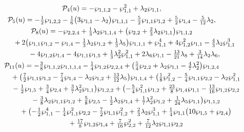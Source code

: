 \documentclass[pdftex]{sigma}
\numberwithin{equation}{section}
\begin{document}
\begin{gather*}
\mathcal{P}_4(u) = - \wp _{1,1,2} - \wp_{1,1}^2 + \lambda_2 \wp_{1,1}, \\
\mathcal{P}_5(u) = - \tfrac{1}{2} \wp _{1,2,2} - \tfrac{1}{6} \big(3 \wp_{1,1} - \lambda_2\big)\wp_{1,1,1} - \tfrac{5}{2}\wp_{1,1} \wp_{1,2} + \tfrac{5}{2} \wp_{1,4} -\tfrac{5}{12} \lambda_2, \\
\mathcal{P}_8(u) = -\wp_{2,2,4} + \tfrac{1}{3} \lambda_2 \wp_{1,1,4} +\big(\wp_{2,2} + \tfrac{2}{3} \lambda_2 \wp_{1,1}\big)\wp _{1,1,2}\\
\hphantom{\mathcal{P}_8(u) =}{} + 2\big(\wp_{1,1}\wp_{1,2} - \wp_{1,4} - \tfrac{1}{3} \lambda_2 \wp_{1,2} + \tfrac{1}{3} \lambda_5\big) \wp _{1,1,1}
 + \wp_{1,1}^4 + 4 \wp_{1,2}^2 \wp_{1,1} - \tfrac{4}{3} \lambda_2 \wp_{1,1}^3 \\
\hphantom{\mathcal{P}_8(u) =}{} - 4 \wp_{1,2} \wp_{1,4}- 4 \wp_{1,1} \wp_{1,5} + \tfrac{1}{3} \lambda_2^2 \wp_{1,1}^2+ 2\lambda_6 \wp_{1,1} - \tfrac{13}{21} \lambda_8 + \tfrac{3}{14} \lambda_2 \lambda_6, \\
\mathcal{P}_{11}(u) = - \tfrac{3}{8} \wp_{1,1,2} \wp_{1,1,1,4} - \tfrac{1}{4} \wp_{1,2} \wp_{2,2,4}
+ \big(\tfrac{5}{4} \wp_{2,2} + \lambda_2 \wp_{1,1} - \tfrac{4}{7}\lambda_2^2\big) \wp_{1,2,4}\\
\hphantom{\mathcal{P}_{11}(u) =}{} + \big(\tfrac{7}{2} \wp_{1,1} \wp_{1,2}- \tfrac{7}{4} \wp_{1,4} - \lambda_2 \wp_{1,2} + \tfrac{13}{12}\lambda_5 \big)\wp_{1,1,4} + \big( \tfrac{1}{8} \wp_{1,2}^2 - \tfrac{5}{4} \wp_{1,1} \wp_{2,2} - \lambda_2\wp_{1,1}^2 \\
\hphantom{\mathcal{P}_{11}(u) =}{}-\tfrac{1}{2} \wp_{1,5}+ \tfrac{3}{4} \wp_{2,4} + \tfrac{3}{7}\lambda_2^2\wp_{1,1} \big) \wp_{1,2,2} + \big({-} \tfrac{5}{4} \wp_{1,1}^2\wp_{1,2} + \tfrac{23}{8} \wp_{1,4}\wp_{1,1}
 - \tfrac{13}{16} \wp_{1,2}\wp_{2,2} \\
\hphantom{\mathcal{P}_{11}(u) =}{}
 - \tfrac{3}{8} \lambda_2 \wp_{1,1}\wp_{1,2}
 + \tfrac{5}{8} \wp_{2,5} - \tfrac{1}{2} \lambda_2 \wp_{1,4} + \tfrac{1}{7} \lambda_2^2\wp_{1,2} + \tfrac{1}{24} \lambda_5 \wp_{1,1}\big) \wp_{1,1,2} \\
\hphantom{\mathcal{P}_{11}(u) =}{}
+ \big({-} \tfrac{1}{2} \wp_{1,1}^4 - \tfrac{1}{4} \wp_{1,1}^2 \wp_{2,2} - \tfrac{7}{2} \wp_{1,1} \wp_{1,2}^2
 + \tfrac{2}{3} \lambda_2 \wp_{1,1}^3 + \tfrac{1}{4} \wp_{1,1} \big(10\wp_{1,5} + \wp_{2,4}\big)\\
\hphantom{\mathcal{P}_{11}(u) =}{}+ \tfrac{17}{8} \wp_{1,2} \wp_{1,4}+ \tfrac{7}{16} \wp_{2,2}^2 + \tfrac{7}{12} \lambda_2 \wp_{1,1}\wp_{2,2}

\end{gather*}
\end{document}
